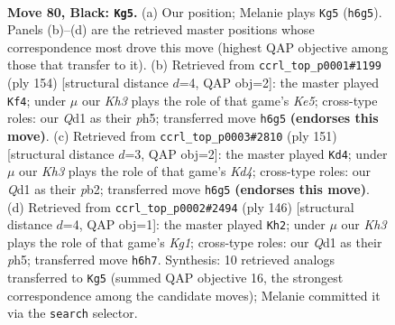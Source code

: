 \documentclass[11pt]{article}
\begin{document}
\clearpage

\begin{figure}[p]\centering
\begin{subfigure}{0.46\textwidth}\centering
\resizebox{\linewidth}{!}{%
\newchessgame
\chessboard[
  setfen={8/8/1p5k/p7/2P5/8/1K6/3q4 b - - 17 80},
  showmover=false,
  pgfstyle=straightmove, color=movearrow, markmove={h6-g5}
]}
\caption{}
\end{subfigure}\hfill
\begin{subfigure}{0.46\textwidth}\centering
\resizebox{\linewidth}{!}{%
\newchessgame
\chessboard[
  setfen={5k2/8/8/p3K2p/2P5/1P6/8/8 w - - 3 78},
  showmover=false,
  pgfstyle=straightmove, color=movearrow, markmove={e5-f4}
]}
\caption{}
\end{subfigure}
\\[4pt]
\begin{subfigure}{0.46\textwidth}\centering
\resizebox{\linewidth}{!}{%
\newchessgame
\chessboard[
  setfen={8/6p1/6Pp/3k4/8/5K2/1P6/8 b - - 4 76},
  showmover=false,
  pgfstyle=straightmove, color=movearrow, markmove={d5-d4}
]}
\caption{}
\end{subfigure}\hfill
\begin{subfigure}{0.46\textwidth}\centering
\resizebox{\linewidth}{!}{%
\newchessgame
\chessboard[
  setfen={8/8/8/3k2Pp/5p1P/8/8/6K1 w - - 12 74},
  showmover=false,
  pgfstyle=straightmove, color=movearrow, markmove={g1-h2}
]}
\caption{}
\end{subfigure}
\caption{\textbf{Move 80, Black: \texttt{Kg5}.} (a) Our position; Melanie plays \texttt{Kg5} (\texttt{h6g5}). Panels (b)--(d) are the retrieved master positions whose correspondence most drove this move (highest QAP objective among those that transfer to it). (b) Retrieved from \texttt{ccrl\_top\_p0001\#1199} (ply 154) [structural distance $d$=4, QAP obj=2]: the master played \texttt{Kf4}; under $\mu$ our \emph{Kh3} plays the role of that game's \emph{Ke5}; cross-type roles: our \emph{Q}d1 as their \emph{p}h5; transferred move \texttt{h6g5} \textbf{(endorses this move)}. (c) Retrieved from \texttt{ccrl\_top\_p0003\#2810} (ply 151) [structural distance $d$=3, QAP obj=2]: the master played \texttt{Kd4}; under $\mu$ our \emph{Kh3} plays the role of that game's \emph{Kd4}; cross-type roles: our \emph{Q}d1 as their \emph{p}b2; transferred move \texttt{h6g5} \textbf{(endorses this move)}. (d) Retrieved from \texttt{ccrl\_top\_p0002\#2494} (ply 146) [structural distance $d$=4, QAP obj=1]: the master played \texttt{Kh2}; under $\mu$ our \emph{Kh3} plays the role of that game's \emph{Kg1}; cross-type roles: our \emph{Q}d1 as their \emph{p}h5; transferred move \texttt{h6h7}. Synthesis: 10 retrieved analogs transferred to \texttt{Kg5} (summed QAP objective 16, the strongest correspondence among the candidate moves); Melanie committed it via the \texttt{search} selector.}
\label{fig:thought-m159}
\end{figure}
\end{document}
